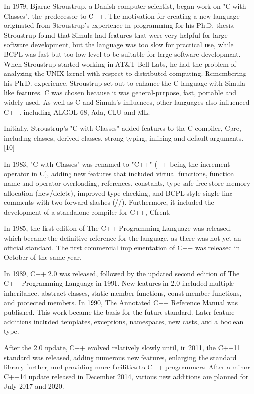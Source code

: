 In 1979, Bjarne Stroustrup, a Danish computer scientist, began work on "C with Classes", the predecessor to C++. The motivation for creating a new language originated from Stroustrup's experience in programming for his Ph.D. thesis. Stroustrup found that Simula had features that were very helpful for large software development, but the language was too slow for practical use, while BCPL was fast but too low-level to be suitable for large software development. When Stroustrup started working in AT\&T Bell Labs, he had the problem of analyzing the UNIX kernel with respect to distributed computing. Remembering his Ph.D. experience, Stroustrup set out to enhance the C language with Simula-like features. C was chosen because it was general-purpose, fast, portable and widely used. As well as C and Simula's influences, other languages also influenced C++, including ALGOL 68, Ada, CLU and ML.

Initially, Stroustrup's "C with Classes" added features to the C compiler, Cpre, including classes, derived classes, strong typing, inlining and default arguments.[10]

In 1983, "C with Classes" was renamed to "C++" (++ being the increment operator in C), adding new features that included virtual functions, function name and operator overloading, references, constants, type-safe free-store memory allocation (new/delete), improved type checking, and BCPL style single-line comments with two forward slashes (//). Furthermore, it included the development of a standalone compiler for C++, Cfront.

In 1985, the first edition of The C++ Programming Language was released, which became the definitive reference for the language, as there was not yet an official standard. The first commercial implementation of C++ was released in October of the same year.

In 1989, C++ 2.0 was released, followed by the updated second edition of The C++ Programming Language in 1991. New features in 2.0 included multiple inheritance, abstract classes, static member functions, const member functions, and protected members. In 1990, The Annotated C++ Reference Manual was published. This work became the basis for the future standard. Later feature additions included templates, exceptions, namespaces, new casts, and a boolean type.

After the 2.0 update, C++ evolved relatively slowly until, in 2011, the C++11 standard was released, adding numerous new features, enlarging the standard library further, and providing more facilities to C++ programmers. After a minor C++14 update released in December 2014, various new additions are planned for July 2017 and 2020.

